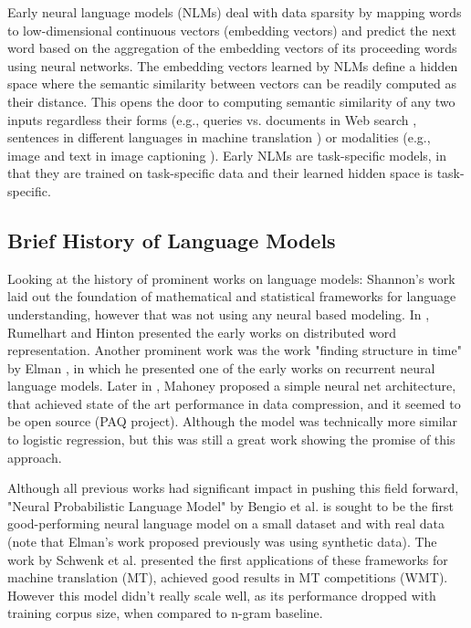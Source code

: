 Early neural language models (NLMs) \cite{bengio2000neural,mikolov2010recurrent,graves2013generating} deal with data sparsity by mapping words to low-dimensional continuous vectors (embedding vectors) and predict the next word based on the aggregation of the embedding vectors of its proceeding words using neural networks. The embedding vectors learned by NLMs define a hidden space where the semantic similarity between vectors can be readily computed as their distance. 
This opens the door to computing semantic similarity of any two inputs regardless their forms (e.g., queries vs. documents in Web search \cite{huang2013learning}, sentences in different languages in machine translation \cite{sutskever2014sequence}) or modalities (e.g., image and text in image captioning \cite{fang2015captions}). Early NLMs are task-specific models, in that they are trained on task-specific data and their learned hidden space is task-specific.


\subsection{Brief History of Language Models}
Looking at the history of prominent works on language models: Shannon's work \cite{shannon1951prediction} laid out the foundation of mathematical and statistical frameworks for language understanding, however that was not using any neural based modeling. 
In \cite{rumelhart1985learning}, Rumelhart and Hinton presented the early works on distributed word representation.
Another prominent work was the work "finding structure in time" by Elman \cite{elman1990finding}, in which he presented one of the early works on recurrent neural language models.
Later in \cite{mahoney2000fast}, Mahoney proposed a simple neural net architecture, that achieved state of the art performance in data compression, and it seemed to be open source (PAQ project). Although the model was technically more similar to logistic regression, but this was still a great work showing the promise of this approach.

Although all previous works had significant impact in pushing this field forward, "Neural Probabilistic Language Model" \cite{bengio2000neural} by Bengio et al. is sought to be the first good-performing neural language model on a small dataset and with real data (note that Elman's work proposed previously was using synthetic data).
The work by Schwenk et al. \cite{schwenk2006continuous} presented the first applications of these frameworks for machine translation (MT), achieved good results in MT competitions (WMT). However this model  didn't really scale well, as its performance dropped with training corpus size, when compared to n-gram baseline. 

